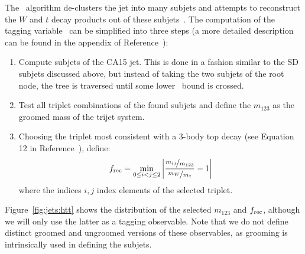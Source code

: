 The \HTT~algorithm de-clusters the jet into many subjets and attempts to reconstruct the $W$ and $t$ decay products out of these subjets~\needcite.
The computation of the tagging variable \frec~can be simplified into three steps (a more detailed description can be found in the appendix of Reference~\needcite):
\begin{enumerate}
    \item Compute subjets of the CA15 jet. This is done in a fashion similar to the SD subjets discussed above, but instead of taking the two subjets of the root node, the tree is traversed until some lower \pt~bound is crossed.
    \item Test all triplet combinations of the found subjets and define the $m_{123}$ as the groomed mass of the trijet system. 
    \item Choosing the triplet most consistent with a 3-body top decay (see Equation 12 in Reference~\needcite), define:
        \begin{equation}
            f_\mathrm{rec} = \min_{0\leq i < j \leq 2} \left|
            \frac{\nicefrac{m_{ij}}{m_{123}}}{\nicefrac{m_W}{m_t}} - 1\right|
        \end{equation}
        where the indices $i,j$ index elements of the selected triplet. 
\end{enumerate}
Figure~\ref{fig:jets:htt} shows the distribution of the selected $m_{123}$ and $f_\mathrm{rec}$, although we will only use the latter as a tagging observable. 
Note that we do not define distinct groomed and ungroomed versions of these observables, as grooming is intrinsically used in defining the subjets. 

